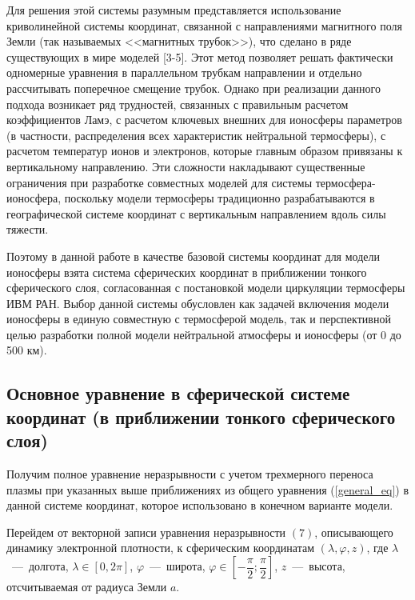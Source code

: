 \documentclass[14pt, a4paper]{extarticle}
\begin{document}
Для решения этой системы разумным представляется использование криволинейной системы координат, связанной с направлениями магнитного поля Земли (так называемых <<магнитных трубок>>), что сделано в ряде существующих в мире моделей [3-5]. Этот метод позволяет решать фактически одномерные уравнения в параллельном трубкам направлении и отдельно рассчитывать поперечное смещение трубок. Однако при реализации данного подхода возникает ряд трудностей, связанных с правильным расчетом коэффициентов Ламэ, с расчетом ключевых внешних для ионосферы параметров (в частности, распределения всех характеристик нейтральной термосферы), с расчетом температур ионов и электронов, которые главным образом привязаны к вертикальному направлению. Эти сложности накладывают существенные ограничения при разработке совместных моделей для системы термосфера-ионосфера, поскольку модели термосферы традиционно разрабатываются в географической системе координат с вертикальным направлением вдоль силы тяжести.

Поэтому в данной работе в качестве базовой системы координат для модели ионосферы взята система сферических координат в приближении тонкого сферического слоя, согласованная с постановкой модели циркуляции термосферы ИВМ РАН. Выбор данной системы обусловлен как задачей включения модели ионосферы в единую совместную с термосферой модель, так и перспективной целью разработки полной модели нейтральной атмосферы и ионосферы (от 0 до 500 км).


\subsection{Основное уравнение в сферической системе координат (в приближении тонкого сферического слоя)}


Получим полное уравнение неразрывности с учетом трехмерного переноса плазмы при указанных выше приближениях из общего уравнения (\ref{general_eq}) в данной системе координат, которое использовано в конечном варианте модели. 


Перейдем от векторной записи уравнения неразрывности $(7)$, описывающего динамику электронной плотности, к сферическим координатам $(\lambda, \varphi, z)$, где $\lambda$~---~долгота, $\lambda \in [0, 2\pi]$, $\varphi$~---~широта, $\varphi \in \left[-\dfrac{\pi}{2};\dfrac{\pi}{2}\right]$, $z$~---~высота, отсчитываемая от радиуса Земли $a$. 
\end{document}
